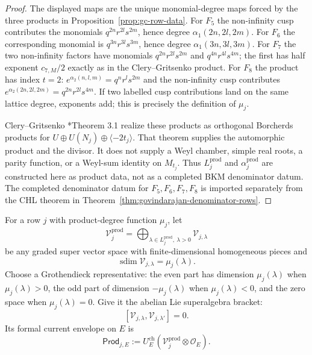 \documentclass[11pt]{memoir}
\newcommand{\sdim}{\operatorname{sdim}}
\begin{document}
\begin{proof}
The displayed maps are the unique monomial-degree maps forced by the
three products in Proposition~\ref{prop:gc-row-data}.  For $F_5$ the
non-infinity cusp contributes the monomials
$q^{2n}r^{2l}s^{2m}$, hence degree $\alpha_1(2n,2l,2m)$.  For $F_6$
the corresponding monomial is $q^{3n}r^{3l}s^{3m}$, hence degree
$\alpha_1(3n,3l,3m)$.  For $F_7$ the two non-infinity factors have
monomials $q^{2n}r^{2l}s^{2m}$ and $q^{4n}r^{4l}s^{4m}$; the first
has half exponent $c_{7,M}/2$ exactly as in the Clery--Gritsenko
product.  For $F_8$ the product has index $t=2$:
$e^{\alpha_2(n,l,m)}=q^nr^ls^{2m}$ and the non-infinity cusp contributes
$e^{\alpha_2(2n,2l,2m)}=q^{2n}r^{2l}s^{4m}$.  If two labelled cusp
contributions land on the same lattice degree, exponents add; this is
precisely the definition of $\mu_j$.

Clery--Gritsenko \cite{GC}*{Theorem 3.1} realize these products as
orthogonal Borcherds products for
$U\oplus U(N_j)\oplus\langle-2t_j\rangle$.  That theorem supplies the
automorphic product and the divisor.  It does not supply a Weyl chamber,
simple real roots, a parity function, or a Weyl-sum identity on
$M_{t_j}$.  Thus $L_j^{\mathrm{prod}}$ and
$\alpha_j^{\mathrm{prod}}$ are constructed here as product data, not as
a completed BKM denominator datum.  The completed denominator datum for
$F_5,F_6,F_7,F_8$ is imported separately from the CHL theorem in
Theorem~\ref{thm:govindarajan-denominator-rows}.
\end{proof}

\begin{definition}
For a row $j$ with product-degree function $\mu_j$, let
$$
\mathcal V_j^{\mathrm{prod}}
=\bigoplus_{\lambda\in L_j^{\mathrm{prod}},\ \lambda>0}
\mathcal V_{j,\lambda}
$$
be any graded super vector space with finite-dimensional homogeneous
pieces and
$$
\sdim\mathcal V_{j,\lambda}=\mu_j(\lambda).
$$
Choose a Grothendieck representative: the even part has dimension $\mu_j(\lambda)$ when
$\mu_j(\lambda)>0$, the odd part of dimension $-\mu_j(\lambda)$ when
$\mu_j(\lambda)<0$, and the zero space when $\mu_j(\lambda)=0$.  Give
it the abelian Lie superalgebra bracket:
$$[\mathcal V_{j,\lambda},\mathcal V_{j,\lambda'}]=0.$$
Its formal current envelope on $E$ is
$$
\mathsf{Prod}_{j,E}
:=U_E^{\mathrm{ch}}
\left(\mathcal V_j^{\mathrm{prod}}\otimes\mathcal O_E\right).
$$
\end{definition}
\end{document}
